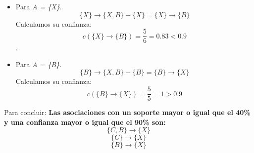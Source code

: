 \documentclass [a4paper] {article}
\begin{document}
\begin{itemize}
	\item Para \textit{A = \{X\}}. \begin{equation*} \{X\} \rightarrow \{X,B\} - \{X\} = \{X\} \rightarrow \{B\} \end{equation*}
	Calculamos su confianza: \begin{equation*} c(\{X\} \rightarrow \{B\}) = \dfrac{5}{6} = 0.83 < 0.9 \end{equation*}.

	\item Para \textit{A = \{B\}}. \begin{equation*} \{B\} \rightarrow \{X,B\} - \{B\} = \{B\} \rightarrow \{X\} \end{equation*}
	Calculamos su confianza: \begin{equation*} c(\{B\} \rightarrow \{X\}) = \dfrac{5}{5} = 1 > 0.9 \end{equation*}
\end{itemize}

Para concluir:
\textbf{Las asociaciones con un soporte mayor o igual que el 40\% y una confianza mayor o igual que el 90\% son:}
\begin{equation*} \{C,B\} \rightarrow \{X\} \end{equation*}
\begin{equation*} \{C\} \rightarrow \{X\} \end{equation*}
\begin{equation*} \{B\} \rightarrow \{X\} \end{equation*}
\end{document}
